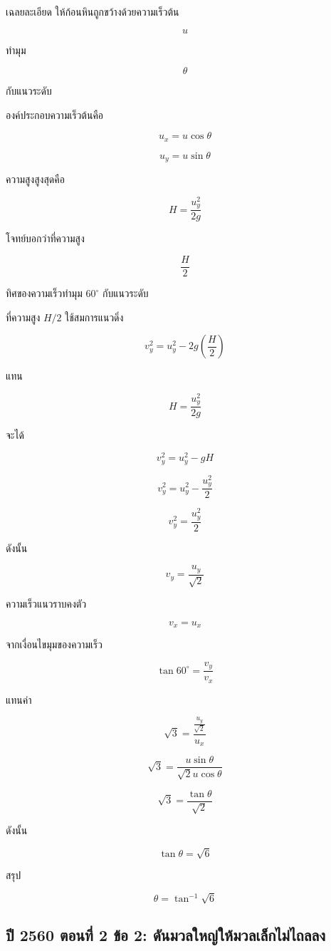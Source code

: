 \begin{examplebox}{เฉลยละเอียด}
ให้ก้อนหินถูกขว้างด้วยความเร็วต้น

\[
u
\]

ทำมุม

\[
\theta
\]

กับแนวระดับ

องค์ประกอบความเร็วต้นคือ

\[
u_x=u\cos\theta
\]

\[
u_y=u\sin\theta
\]

ความสูงสูงสุดคือ

\[
H=\frac{u_y^2}{2g}
\]

โจทย์บอกว่าที่ความสูง

\[
\frac{H}{2}
\]

ทิศของความเร็วทำมุม $60^\circ$ กับแนวระดับ

ที่ความสูง $H/2$ ใช้สมการแนวดิ่ง

\[
v_y^2=u_y^2-2g\left(\frac{H}{2}\right)
\]

แทน

\[
H=\frac{u_y^2}{2g}
\]

จะได้

\[
v_y^2=u_y^2-gH
\]

\[
v_y^2=u_y^2-\frac{u_y^2}{2}
\]

\[
v_y^2=\frac{u_y^2}{2}
\]

ดังนั้น

\[
v_y=\frac{u_y}{\sqrt{2}}
\]

ความเร็วแนวราบคงตัว

\[
v_x=u_x
\]

จากเงื่อนไขมุมของความเร็ว

\[
\tan60^\circ=\frac{v_y}{v_x}
\]

แทนค่า

\[
\sqrt{3}=
\frac{\frac{u_y}{\sqrt{2}}}{u_x}
\]

\[
\sqrt{3}=
\frac{u\sin\theta}{\sqrt{2}u\cos\theta}
\]

\[
\sqrt{3}=\frac{\tan\theta}{\sqrt{2}}
\]

ดังนั้น

\[
\tan\theta=\sqrt{6}
\]

สรุป

\[
\boxed{\theta=\tan^{-1}\sqrt{6}}
\]
\end{examplebox}

\subsection{ปี 2560 ตอนที่ 2 ข้อ 2: ดันมวลใหญ่ให้มวลเล็กไม่ไถลลง}

